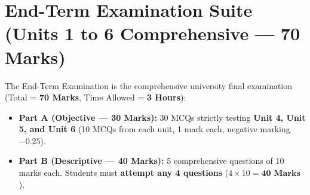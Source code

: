\documentclass[a4paper,11pt,oneside,openany]{book}
\begin{document}
\newpage



\chapter{End-Term Examination Suite (Units 1 to 6 Comprehensive --- 70 Marks)}
\label{chap:endterm}
\noindent
The End-Term Examination is the comprehensive university final examination (Total = \textbf{70 Marks}, Time Allowed = \textbf{3 Hours}):
\begin{itemize}[leftmargin=8mm]
    \item \textbf{Part A (Objective --- 30 Marks):} 30 MCQs strictly testing \textbf{Unit 4, Unit 5, and Unit 6} (10 MCQs from each unit, 1 mark each, negative marking $-0.25$).
    \item \textbf{Part B (Descriptive --- 40 Marks):} 5 comprehensive questions of 10 marks each. Students must \textbf{attempt any 4 questions} ($4 \times 10 = \mathbf{40\text{ Marks}}$).
\end{itemize}

\newpage


\end{document}
